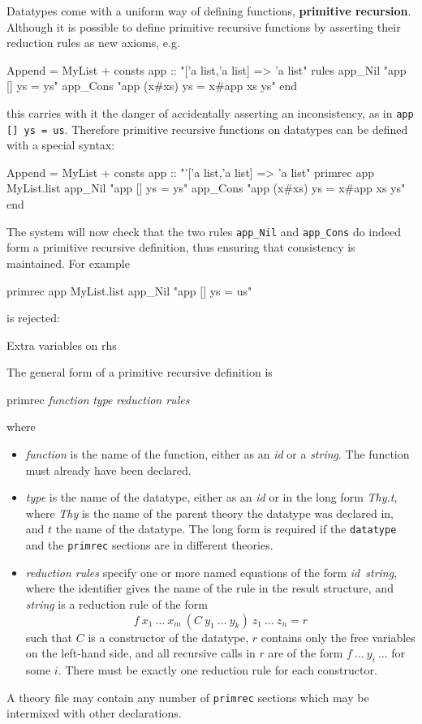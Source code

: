 Datatypes come with a uniform way of defining functions, {\bf primitive
  recursion}. Although it is possible to define primitive recursive functions
by asserting their reduction rules as new axioms, e.g.\
\begin{ttbox}
Append = MyList +
consts app :: "['a list,'a list] => 'a list"
rules 
   app_Nil   "app [] ys = ys"
   app_Cons  "app (x#xs) ys = x#app xs ys"
end
\end{ttbox}
this carries with it the danger of accidentally asserting an inconsistency,
as in \verb$app [] ys = us$. Therefore primitive recursive functions on
datatypes can be defined with a special syntax:
\begin{ttbox}
Append = MyList +
consts app :: "'['a list,'a list] => 'a list"
primrec app MyList.list
   app_Nil   "app [] ys = ys"
   app_Cons  "app (x#xs) ys = x#app xs ys"
end
\end{ttbox}
The system will now check that the two rules \verb$app_Nil$ and
\verb$app_Cons$ do indeed form a primitive recursive definition, thus
ensuring that consistency is maintained. For example
\begin{ttbox}
primrec app MyList.list
    app_Nil   "app [] ys = us"
\end{ttbox}
is rejected:
\begin{ttbox}
Extra variables on rhs
\end{ttbox}
\bigskip

The general form of a primitive recursive definition is
\begin{ttbox}
primrec {\it function} {\it type}
    {\it reduction rules}
\end{ttbox}
where
\begin{itemize}
\item {\it function} is the name of the function, either as an {\it id} or a
  {\it string}. The function must already have been declared.
\item {\it type} is the name of the datatype, either as an {\it id} or in the
  long form {\it Thy.t}, where {\it Thy} is the name of the parent theory the
  datatype was declared in, and $t$ the name of the datatype. The long form
  is required if the {\tt datatype} and the {\tt primrec} sections are in
  different theories.
\item {\it reduction rules} specify one or more named equations of the form
  {\it id\/}~{\it string}, where the identifier gives the name of the rule in
  the result structure, and {\it string} is a reduction rule of the form \[
  f~x_1~\dots~x_m~(C~y_1~\dots~y_k)~z_1~\dots~z_n = r \] such that $C$ is a
  constructor of the datatype, $r$ contains only the free variables on the
  left-hand side, and all recursive calls in $r$ are of the form
  $f~\dots~y_i~\dots$ for some $i$. There must be exactly one reduction
  rule for each constructor.
\end{itemize}
A theory file may contain any number of {\tt primrec} sections which may be
intermixed with other declarations.

